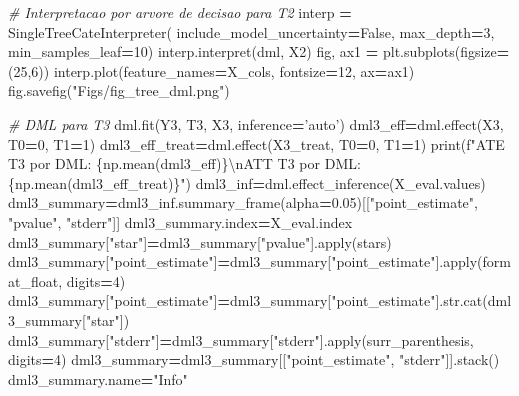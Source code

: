 \documentclass[
]{article}
\newenvironment{Shaded}{\begin{snugshade}}{\end{snugshade}}
\newcommand{\BuiltInTok}[1]{#1}
\newcommand{\CharTok}[1]{\textcolor[rgb]{0.31,0.60,0.02}{#1}}
\newcommand{\CommentTok}[1]{\textcolor[rgb]{0.56,0.35,0.01}{\textit{#1}}}
\newcommand{\DecValTok}[1]{\textcolor[rgb]{0.00,0.00,0.81}{#1}}
\newcommand{\FloatTok}[1]{\textcolor[rgb]{0.00,0.00,0.81}{#1}}
\newcommand{\NormalTok}[1]{#1}
\newcommand{\OperatorTok}[1]{\textcolor[rgb]{0.81,0.36,0.00}{\textbf{#1}}}
\newcommand{\SpecialCharTok}[1]{\textcolor[rgb]{0.00,0.00,0.00}{#1}}
\newcommand{\SpecialStringTok}[1]{\textcolor[rgb]{0.31,0.60,0.02}{#1}}
\newcommand{\StringTok}[1]{\textcolor[rgb]{0.31,0.60,0.02}{#1}}
\newcommand{\VariableTok}[1]{\textcolor[rgb]{0.00,0.00,0.00}{#1}}
\begin{document}
\begin{Shaded}
\begin{Highlighting}[]
{\CommentTok{# Interpretacao por arvore de decisao para T2}
\NormalTok{interp }\OperatorTok{=}\NormalTok{ SingleTreeCateInterpreter(}
\NormalTok{    include_model_uncertainty}\OperatorTok{=}\VariableTok{False}\NormalTok{, }
\NormalTok{    max_depth}\OperatorTok{=}\DecValTok{3}\NormalTok{, }
\NormalTok{    min_samples_leaf}\OperatorTok{=}\DecValTok{10}\NormalTok{)}
\NormalTok{interp.interpret(dml, X2)}
\NormalTok{fig, ax1 }\OperatorTok{=}\NormalTok{ plt.subplots(figsize}\OperatorTok{=}\NormalTok{(}\DecValTok{25}\NormalTok{,}\DecValTok{6}\NormalTok{))}
\NormalTok{interp.plot(feature_names}\OperatorTok{=}\NormalTok{X_cols, fontsize}\OperatorTok{=}\DecValTok{12}\NormalTok{, ax}\OperatorTok{=}\NormalTok{ax1)}
\NormalTok{fig.savefig(}\StringTok{"Figs/fig_tree_dml.png"}\NormalTok{)}

\CommentTok{# DML para T3}
\NormalTok{dml.fit(Y3, T3, X3, inference}\OperatorTok{=}\StringTok{'auto'}\NormalTok{)}
\NormalTok{dml3_eff}\OperatorTok{=}\NormalTok{dml.effect(X3, T0}\OperatorTok{=}\DecValTok{0}\NormalTok{, T1}\OperatorTok{=}\DecValTok{1}\NormalTok{)}
\NormalTok{dml3_eff_treat}\OperatorTok{=}\NormalTok{dml.effect(X3_treat, T0}\OperatorTok{=}\DecValTok{0}\NormalTok{, T1}\OperatorTok{=}\DecValTok{1}\NormalTok{)}
\BuiltInTok{print}\NormalTok{(}\SpecialStringTok{f"ATE T3 por DML: }\SpecialCharTok{\{np.}\NormalTok{mean(dml3_eff)}\SpecialCharTok{\}}\CharTok{\textbackslash{}n}\SpecialStringTok{ATT T3 por DML: }\SpecialCharTok{\{np.}\NormalTok{mean(dml3_eff_treat)}\SpecialCharTok{\}}\SpecialStringTok{"}\NormalTok{)}
\NormalTok{dml3_inf}\OperatorTok{=}\NormalTok{dml.effect_inference(X_eval.values)}
\NormalTok{dml3_summary}\OperatorTok{=}\NormalTok{dml3_inf.summary_frame(alpha}\OperatorTok{=}\FloatTok{0.05}\NormalTok{)[[}\StringTok{"point_estimate"}\NormalTok{, }\StringTok{"pvalue"}\NormalTok{, }\StringTok{"stderr"}\NormalTok{]]}
\NormalTok{dml3_summary.index}\OperatorTok{=}\NormalTok{X_eval.index}
\NormalTok{dml3_summary[}\StringTok{"star"}\NormalTok{]}\OperatorTok{=}\NormalTok{dml3_summary[}\StringTok{"pvalue"}\NormalTok{].}\BuiltInTok{apply}\NormalTok{(stars)}
\NormalTok{dml3_summary[}\StringTok{"point_estimate"}\NormalTok{]}\OperatorTok{=}\NormalTok{dml3_summary[}\StringTok{"point_estimate"}\NormalTok{].}\BuiltInTok{apply}\NormalTok{(format_float, digits}\OperatorTok{=}\DecValTok{4}\NormalTok{)}
\NormalTok{dml3_summary[}\StringTok{"point_estimate"}\NormalTok{]}\OperatorTok{=}\NormalTok{dml3_summary[}\StringTok{"point_estimate"}\NormalTok{].}\BuiltInTok{str}\NormalTok{.cat(dml3_summary[}\StringTok{"star"}\NormalTok{])}
\NormalTok{dml3_summary[}\StringTok{"stderr"}\NormalTok{]}\OperatorTok{=}\NormalTok{dml3_summary[}\StringTok{"stderr"}\NormalTok{].}\BuiltInTok{apply}\NormalTok{(surr_parenthesis, digits}\OperatorTok{=}\DecValTok{4}\NormalTok{)}
\NormalTok{dml3_summary}\OperatorTok{=}\NormalTok{dml3_summary[[}\StringTok{"point_estimate"}\NormalTok{, }\StringTok{"stderr"}\NormalTok{]].stack()}
\NormalTok{dml3_summary.name}\OperatorTok{=}\StringTok{"Info"}

}
\end{Highlighting}
\end{Shaded}
\end{document}
